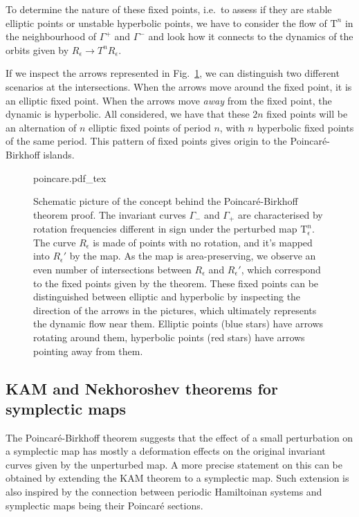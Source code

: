 To determine the nature of these fixed points, i.e.\ to assess if they are stable elliptic points or unstable hyperbolic points, we have to consider the flow of $\mathrm{T}^n$ in the neighbourhood of $\Gamma^+$ and $\Gamma^-$ and look how it connects to the dynamics of the orbits given by $R_\epsilon \to T^n R_\epsilon$.

If we inspect the arrows represented in Fig.~\ref{fig:tnepsilon}, we can distinguish two different scenarios at the intersections. When the arrows move around the fixed point, it is an elliptic fixed point. When the arrows move \textit{away} from the fixed point, the dynamic is hyperbolic. All considered, we have that these $2n$ fixed points will be an alternation of $n$ elliptic fixed points of period $n$, with $n$ hyperbolic fixed points of the same period. This pattern of fixed points gives origin to the Poincaré-Birkhoff islands.

\begin{figure}
	\centering
	\def\svgwidth{0.75\columnwidth}
    {poincare.pdf_tex}
    \caption{Schematic picture of the concept behind the Poincaré-Birkhoff theorem proof. The invariant curves $\Gamma_-$ and $\Gamma_+$ are characterised by rotation frequencies different in sign under the perturbed map $\mathrm{T}^n_\epsilon$. The curve $R_\epsilon$ is made of points with no rotation, and it's mapped into $R_\epsilon'$ by the map. As the map is area-preserving, we observe an even number of intersections between $R_\epsilon$ and $R_\epsilon'$, which correspond to the fixed points given by the theorem. These fixed points can be distinguished between elliptic and hyperbolic by inspecting the direction of the arrows in the pictures, which ultimately represents the dynamic flow near them. Elliptic points (blue stars) have arrows rotating around them, hyperbolic points (red stars) have arrows pointing away from them.}
    \label{fig:tnepsilon}
\end{figure}

\subsection{KAM and Nekhoroshev theorems for symplectic maps}

The Poincaré-Birkhoff theorem suggests that the effect of a small perturbation on a symplectic map has mostly a deformation effects on the original invariant curves given by the unperturbed map. A more precise statement on this can be obtained by extending the KAM theorem to a symplectic map. Such extension is also inspired by the connection between periodic Hamiltoinan systems and symplectic maps being their Poincaré sections.

